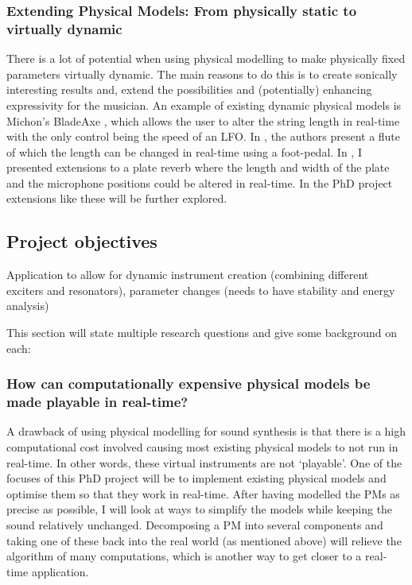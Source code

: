 \subsubsection*{Extending Physical Models: From physically static to virtually dynamic}
There is a lot of potential when using physical modelling to make physically fixed parameters virtually dynamic. The main reasons to do this is to create sonically interesting results and, extend the possibilities and (potentially) enhancing expressivity for the musician.
An example of existing dynamic physical models is Michon’s BladeAxe \cite{Michon2016}, which allows the user to alter the string length in real-time with the only control being the speed of an LFO. In \cite{Gelineck2005}, the authors present a flute of which the length can be changed in real-time using a foot-pedal. In \cite{Willemsen2017}, I presented extensions to a plate reverb where the length and width of the plate and the microphone positions could be altered in real-time. In the PhD project extensions like these will be further explored.

\subsection{Project objectives}
Application to allow for dynamic instrument creation (combining different exciters and resonators), parameter changes (needs to have stability and energy analysis) 

This section will state multiple research questions and give some background on each:

\subsubsection*{How can computationally expensive physical models be made playable in real-time?}
A drawback of using physical modelling for sound synthesis is that there is a high computational cost involved causing most existing physical models to not run in real-time. In other words, these virtual instruments are not ‘playable’. One of the focuses of this PhD project will be to implement existing physical models and optimise them so that they work in real-time. 
After having modelled the PMs as precise as possible, I will look at ways to simplify the models while keeping the sound relatively unchanged. Decomposing a PM into several components and taking one of these back into the real world (as mentioned above) will relieve the algorithm of many computations, which is another way to get closer to a real-time application.

